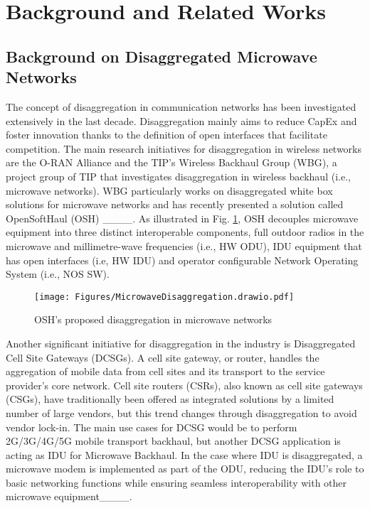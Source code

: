 \section{Background and Related Works}
\subsection{Background on Disaggregated Microwave Networks}
\label{subsec:dissmic}
The concept of disaggregation in communication networks has been investigated extensively in the last decade. Disaggregation mainly aims to reduce CapEx and foster innovation thanks to the definition of open interfaces that facilitate competition. The main research initiatives for disaggregation in wireless networks are the O-RAN Alliance and the TIP’s Wireless Backhaul Group (WBG), a project group of TIP that investigates disaggregation in wireless backhaul (i.e., microwave networks). WBG particularly works on disaggregated white box solutions for microwave networks and has recently presented a solution called OpenSoftHaul (OSH) ____. As illustrated in Fig. \ref{fig:microwavedisaggregated}, OSH decouples microwave equipment into three distinct interoperable components, full outdoor radios in the microwave and millimetre-wave frequencies (i.e., HW ODU), IDU equipment that has open interfaces (i.e, HW IDU) and operator configurable Network Operating System (i.e., NOS SW).
\begin{figure}[t]
	\centering
	\texttt{[image: Figures/MicrowaveDisaggregation.drawio.pdf]}
	\caption{OSH's proposed disaggregation in microwave networks}
	\label{fig:microwavedisaggregated}
        \vspace{-20pt}
\end{figure}
Another significant initiative for disaggregation in the industry is Disaggregated Cell Site Gateways (DCSGs). A cell site gateway, or router, handles the aggregation of mobile data from cell sites and its transport to the service provider’s core network. Cell site routers (CSRs), also known as cell site gateways (CSGs), have traditionally been offered as integrated solutions by a limited number of large vendors, but this trend changes through disaggregation to avoid vendor lock-in. The main use cases for DCSG would be to perform 2G/3G/4G/5G mobile transport backhaul, but another DCSG  application is acting as IDU for Microwave Backhaul. In the case where IDU is disaggregated, a microwave modem is implemented as part of the ODU, reducing the IDU’s role to basic networking functions while ensuring seamless interoperability with other microwave equipment____. 

